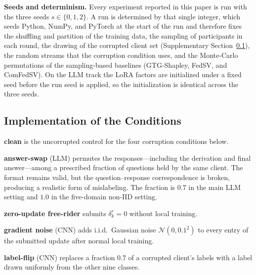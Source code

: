 \documentclass[letterpaper]{article} %
\theoremstyle{plain}
\begin{document}
\textbf{Seeds and determinism.} Every experiment reported in this paper is run
with the three seeds $s \in \{0, 1, 2\}$. A run is determined by that single
integer, which seeds Python, NumPy, and PyTorch at the start of the run and
therefore fixes the shuffling and partition of the training data, the sampling
of participants in each round, the drawing of the corrupted client set
(Supplementary Section~\ref{app:conditions}), the random streams that the
corruption condition uses,
and the Monte-Carlo permutations of the sampling-based baselines
(GTG-Shapley, FedSV, and ComFedSV). On the LLM track the LoRA
factors are initialized under a fixed seed before the run seed is applied, so
the initialization is identical across the three seeds.

\subsection{Implementation of the Conditions}
\label{app:conditions}

\textbf{clean} is the uncorrupted control for the four corruption
conditions below.

\textbf{answer-swap} (LLM) permutes the responses---including the derivation
and final answer---among a prescribed fraction of questions held by the same
client. The format remains valid, but the question--response correspondence
is broken, producing a realistic form of mislabeling. The fraction is $0.7$
in the main LLM setting and $1.0$ in the five-domain non-IID setting.

\textbf{zero-update free-rider} submits $\delta_k^r = 0$ without local
training.

\textbf{gradient noise} (CNN) adds i.i.d.\ Gaussian noise
$\mathcal{N}(0, 0.1^2)$ to every entry of the submitted update after normal
local training.

\textbf{label-flip} (CNN) replaces a fraction $0.7$ of a corrupted client's
labels with a label drawn uniformly from the other nine classes.
\end{document}
